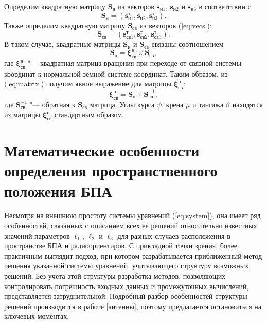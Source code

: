 \documentclass[a4paper,12pt]{article}
\begin{document}
Определим квадратную матрицу $\mathbf{S}_{\text{н}}$ из векторов $\mathbf{s}_{\text{н}1}$, $\mathbf{s}_{\text{н}2}$ и $\mathbf{s}_{\text{н}3}$ в
соответствии с
\begin{equation*}
    \mathbf{S}_{\text{н}} = \left(\mathbf{s}_{\text{н}1}^\text{т}, \mathbf{s}_{\text{н}2}^\text{т}, \mathbf{s}_{\text{н}3}^\text{т}\right).
\end{equation*}
Также определим квадратную матрицу $\mathbf{S}_{\text{св}}$ из векторов (\ref{eq:vecs}):
\begin{equation*}
    \mathbf{S}_{\text{св}} = \left(\mathbf{s}_{\text{св}1}^\text{т}, \mathbf{s}_{\text{св}2}^\text{т}, \mathbf{s}_{\text{св}3}^\text{т}\right).
\end{equation*}
В таком случае, квадратные матрицы $\mathbf{S}_{\text{н}}$ и $\mathbf{S}_{\text{св}}$ связаны соотношением
\begin{equation}\label{eq:matrix}
    \mathbf{S}_{\text{н}} = \mathbf{\xi}_{\text{св}}^{\text{н}} \times \mathbf{S}_{\text{св}},
\end{equation}
где $\mathbf{\xi}_{\text{св}}^{\text{н}}$ "--- квадратная матрица вращения при переходе от связной системы координат к
нормальной земной системе координат. Таким образом, из (\ref{eq:matrix}) получим явное выражение для матрицы $\mathbf{\xi}_{\text{св}}^{\text{н}}$:
\begin{equation*}
    \mathbf{\xi}_{\text{св}}^{\text{н}} = \mathbf{S}_{\text{н}} \times \mathbf{S}_{\text{св}}^{-1},
\end{equation*}
где $\mathbf{S}_{\text{св}}^{-1}$ "--- обратная к $\mathbf{S}_{\text{св}}$ матрица. Углы курса $\psi$, крена $\mu$ и
тангажа $\vartheta$ находятся из матрицы $\mathbf{\xi}_{\text{св}}^{\text{н}}$ стандартным образом.

\section{Математические особенности определения пространственного положения БПА}
Несмотря на внешнюю простоту системы уравнений (\ref{eq:system}), она имеет ряд особенностей,
связанных с описанием всех ее решений относительно известных значений параметров $\ell_1$, $\ell_2$
и $\ell_3$ для разных случаев расположения в пространстве БПА и радиоориентиров. С прикладной точки
зрения, более практичным выглядит подход, при котором разрабатывается приближенный метод решения
указанной системы уравнений, учитывающего структуру возможных решений. Без учета этой структуры
разработка методов, позволяющих контролировать погрешность входных данных и промежуточных вычислений,
представляется затруднительной. Подробный разбор особенностей структуры решений производится в работе
[антенны], поэтому предлагается остановиться на ключевых моментах.
\end{document}
